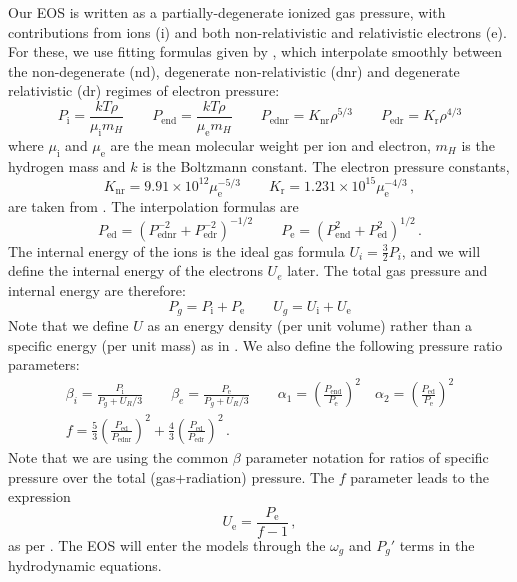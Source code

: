 \documentclass[../main.tex]{subfiles}
\begin{document}
Our EOS is written as a partially-degenerate ionized gas pressure, with contributions from ions (i) and both non-relativistic and relativistic electrons (e).  For these, we use fitting formulas given by \cite{Paczynski1983}, which interpolate smoothly between the non-degenerate (nd), degenerate non-relativistic (dnr) and degenerate relativistic (dr) regimes of electron pressure:
\begin{equation}
    P_\text{i}=\frac{kT\rho}{\mu_\text{i}m_H} \qquad 
    P_\text{end}=\frac{kT\rho}{\mu_\text{e}m_H} \qquad
    P_\text{ednr}=K_\text{nr}\rho^{5/3} \qquad
    P_\text{edr}=K_\text{r}\rho^{4/3}
\end{equation}
where $\mu_\text{i}$ and $\mu_\text{e}$ are the mean molecular weight per ion and electron, $m_H$ is the hydrogen mass and $k$ is the Boltzmann constant. The electron pressure constants,
\begin{equation}
    K_\text{nr}=9.91\times 10^{12}\mu_\text{e}^{-5/3} \qquad 
    K_\text{r}=1.231\times 10^{15}\mu_\text{e}^{-4/3} \,,
\end{equation}
are taken from \citet{Paczynski1983}. The interpolation formulas are
\begin{equation}\label{eq:eos_electron_interp}
    P_\text{ed}=(P_\text{ednr}^{-2}+P_\text{edr}^{-2})^{-1/2} \qquad
    P_\text{e}=(P_\text{end}^2+P_\text{ed}^2)^{1/2} \,.
\end{equation}
The internal energy of the ions is the ideal gas formula $U_i=\frac{3}{2}P_i$, and we will define the internal energy of the electrons $U_e$ later. The total gas pressure and internal energy are therefore:
\begin{equation}
    P_g=P_\text{i}+P_\text{e} \qquad U_g=U_\text{i}+U_\text{e}
\end{equation}
Note that we define $U$ as an energy density (per unit volume) rather than a specific energy (per unit mass) as in \cite{Paczynski1983}.  We also define the following pressure ratio parameters:
\begin{gather}
    \label{eq:pressure_params}
    \beta_i=\frac{P_\text{i}}{P_g+U_R/3} \qquad
    \beta_e=\frac{P_\text{e}}{P_g+U_R/3} \qquad%
    \alpha_1=\left(\frac{P_\text{end}}{P_\text{e}}\right)^2 \quad
    \alpha_2=\left(\frac{P_\text{ed}}{P_\text{e}}\right)^2 \nonumber\\
    f=\frac{5}{3}\left(\frac{P_\text{ed}}{P_\text{ednr}}\right)^2+\frac{4}{3}\left(\frac{P_\text{ed}}{P_\text{edr}}\right)^2\,.
\end{gather}
Note that we are using the common $\beta$ parameter notation for ratios of specific pressure over the total (gas+radiation) pressure. The $f$ parameter leads to the expression
\begin{equation}
    \label{eq:Ue}
    U_\text{e}=\frac{P_\text{e}}{f-1}\,,
\end{equation}
as per \citet{Paczynski1983}. The EOS will enter the models through the $\omega_g$ and $P_g'$ terms in the hydrodynamic equations.
\end{document}
